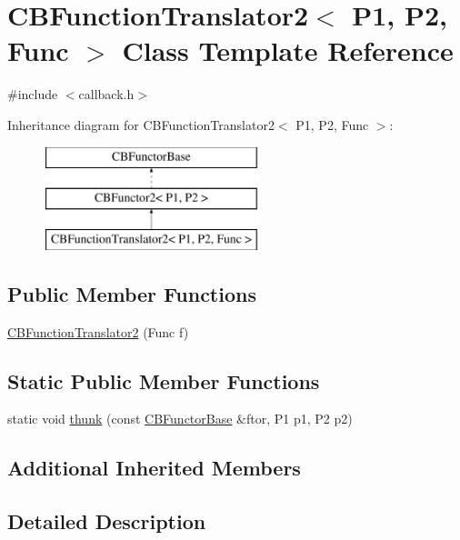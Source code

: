\hypertarget{class_c_b_function_translator2}{\section{C\+B\+Function\+Translator2$<$ P1, P2, Func $>$ Class Template Reference}
\label{class_c_b_function_translator2}
}


{\ttfamily \#include $<$callback.\+h$>$}

Inheritance diagram for C\+B\+Function\+Translator2$<$ P1, P2, Func $>$\+:\begin{figure}[H]
\begin{center}
\leavevmode
\includegraphics[height=3.000000cm]{class_c_b_function_translator2}
\end{center}
\end{figure}
\subsection*{Public Member Functions}
\begin{DoxyCompactItemize}
\item 
\hyperlink{class_c_b_function_translator2_a44ecf241306c6588d3498703101c08cb}{C\+B\+Function\+Translator2} (Func f)
\end{DoxyCompactItemize}
\subsection*{Static Public Member Functions}
\begin{DoxyCompactItemize}
\item 
static void \hyperlink{class_c_b_function_translator2_ac87f753ab63e1514c4d025b10dba2fc4}{thunk} (const \hyperlink{class_c_b_functor_base}{C\+B\+Functor\+Base} \&ftor, P1 p1, P2 p2)
\end{DoxyCompactItemize}
\subsection*{Additional Inherited Members}


\subsection{Detailed Description}

